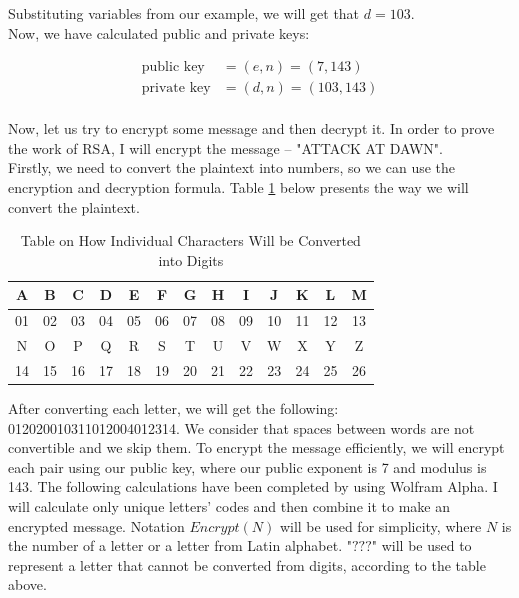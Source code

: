 \documentclass[a4paper, 12pt]{article}
\begin{document}
Substituting variables from our example, we will get that $d=103$.\\

Now, we have calculated public and private keys:

\begin{align*}
  \text{public key}&=(e,n)=(7,143)\\
  \text{private key}&=(d,n)=(103,143)\\
  \end{align*}

Now, let us try to encrypt some message and then decrypt it. In order to prove the work of RSA, I
will encrypt the message – "ATTACK AT DAWN".\\

Firstly, we need to convert the plaintext into numbers, so we can use the encryption and decryption
formula. Table \ref{table:simple} below presents the way we will convert the plaintext.

\begin{table}[h]
  \begin{center}
        \caption{Table on How Individual Characters Will be Converted into Digits}
    \begin{tabular}{c|c|c|c|c|c|c|c|c|c|c|c|c}
      A& B& C& D& E& F& G& H& I& J& K& L& M\\
      \hline
      01& 02& 03& 04& 05& 06& 07& 08& 09& 10& 11& 12& 13\\

      N& O& P& Q& R& S& T& U& V& W& X& Y& Z\\
      \hline                   
      14& 15& 16& 17& 18& 19& 20& 21& 22& 23& 24& 25& 26\\
    \end{tabular}
    \label{table:simple}
  \end{center}
  \end{table}


After converting each letter, we will get the following: 012020010311012004012314. We
consider that spaces between words are not convertible and we skip them. To encrypt the message
efficiently, we will encrypt each pair using our public key, where our public exponent is 7 and
modulus is 143. The following calculations have been completed by using Wolfram Alpha. I will
calculate only unique letters’ codes and then combine it to make an encrypted message. Notation
$Encrypt(N)$ will be used for simplicity, where $N$ is the number of a letter or a letter from Latin alphabet.
"$???$" will be used to represent a letter that cannot be converted from digits, according to the table above.
\end{document}
